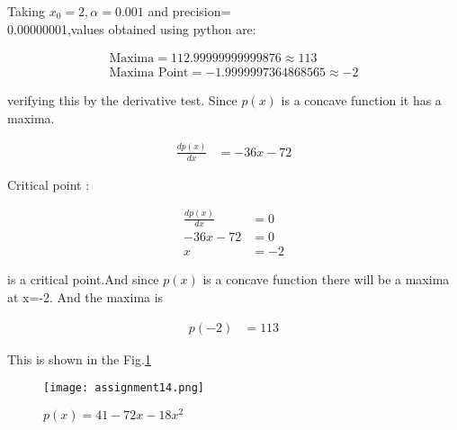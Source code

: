 \documentclass[journal,12pt,twocolumn]{IEEEtran}
\begin{document}
    Taking $x_0=2,\alpha=0.001$ and precision= \\ 0.00000001,values obtained using python are:
    
    \begin{align}
        \boxed{\text{Maxima} =112.99999999999876 \approx 113 }\\
        \boxed{\text{Maxima Point} =  -1.9999997364868565\approx -2}
    \end{align}
    
verifying this by the derivative test.
Since $p(x)$ is a concave function it has a maxima.

\begin{align}
\frac{dp(x)}{dx}&=-36x-72
\end{align}

Critical point :

\begin{align}
 \frac{dp(x)}{dx}&=0\\
 -36x-72&=0\\
 x&=-2
\end{align} 

is a critical point.And since $p(x)$ is a concave function there will be a maxima at x=-2.
And the maxima is

\begin{align}
p(-2)&=113
\end{align}

This is shown in the Fig.\ref{p(x)}  
\begin{figure}[!ht]
    \centering
    \texttt{[image: assignment14.png]}
    \caption{$p(x)=41-72x-18x^2$}
    \label{p(x)}	
\end{figure}
\end{document}
